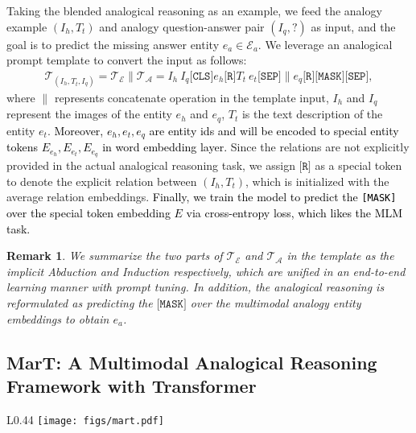 \documentclass{article} \usepackage{iclr2023_conference,times}
\newtheorem{remark}{\noindent \textbf{Remark}}
\newcommand{\ours}{MarT}
\begin{document}
Taking the blended analogical reasoning as an example, we feed the analogy example $(I_h, T_t)$ and analogy question-answer pair $(I_q, ?)$ as input, and the goal is to predict the missing answer entity $e_a\in \mathcal{E}_a$.
We leverage an analogical prompt template to convert the input as  follows:
\begin{equation}
    \begin{aligned}
  \mathcal{T}_{(I_h, T_t, I_q)}= \mathcal{T_E} \parallel \mathcal{T_A} = I_h \ I_q \texttt{[CLS]} e_h \texttt{[R]} T_t \ e_t \texttt{[SEP]} \parallel e_q \texttt{[R][MASK][SEP]},
    \end{aligned}
\end{equation}
where $\parallel$ represents concatenate operation in the template input, $I_h$ and $I_q$ represent the images of the entity $e_h$ and $e_q$, $T_t$ is the text description of the entity $e_t$. \textcolor{black}{Moreover, $e_h, e_t, e_q$ are entity ids and will be encoded to special entity tokens $E_{e_h}, E_{e_t}, E_{e_q}$ in word embedding layer.}
Since the relations are not explicitly provided in the actual analogical reasoning task, we assign $\texttt{[R]}$ as a special token to denote the explicit relation between ${(I_h, T_t)}$, which is initialized with the average relation embeddings.
\textcolor{black}{
Finally, we train the model to predict the \texttt{[MASK]} over the special token embedding $E$ via cross-entropy loss, which likes the MLM task.
}
\begin{remark}
We summarize the two parts of $\mathcal{T_E}$ and $\mathcal{T_A}$ in the template as the implicit \textit{Abduction} and  \textit{Induction} respectively, which are unified in an end-to-end learning manner with prompt tuning.
In addition, the analogical reasoning is reformulated as predicting the $\texttt{[MASK]}$ over the multimodal analogy entity embeddings to obtain $e_a$.
\end{remark}




\subsection{{\ours}: A Multimodal Analogical Reasoning Framework with Transformer}

\begin{wrapfigure}{L}{0.44\textwidth}
\centering \texttt{[image: figs/mart.pdf]}
\caption{The {\ours} framework.}
\label{fig:mart}
\vspace{-0.2cm}
\end{wrapfigure}
\end{document}
